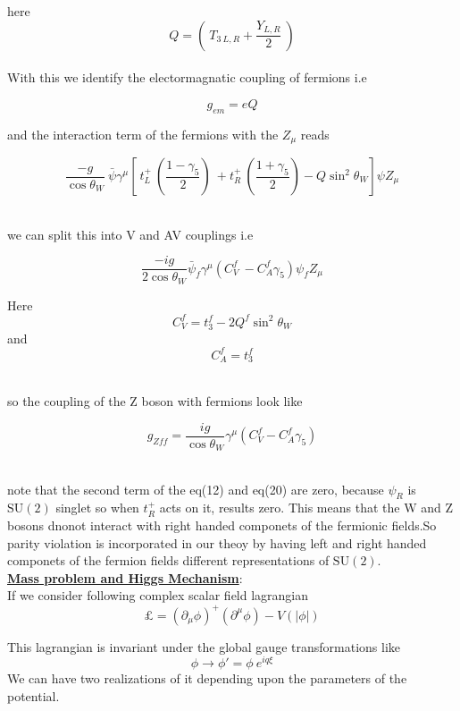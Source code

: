 \documentclass[12pt]{article}
\newcommand{\be}{\begin{equation}}
\newcommand{\ee}{\end{equation}}
\begin{document}
here 
\be Q=  \left (~T_{3\ L,R} +\frac{Y_{L,R}}{2}~\right) \ee \\

With this we identify the electormagnatic coupling of fermions i.e

$$g_{em}=eQ $$




and the interaction term of the fermions with the $Z_{\mu}$ reads

\be \frac{-g}{\cos{\theta_{W}}} ~ \bar{\psi} \gamma^{\mu}\left [ ~t_{L}^{+}~\left (\frac {1- \gamma_{5} } {2} \right) ~+  t_{R}^{+}~\left (\frac {1+ \gamma_{5} } {2}\right )-Q\sin^{2}{\theta_{W}} \right]\psi Z_{\mu} \ee \





we can split this into V and AV couplings i.e

\be \frac{-ig}{2\cos \theta_{W}} \bar \psi_{f} \gamma^{\mu} \left( C_{V}^{f}~-C_{A}^{f} \gamma_{5} \right ) \psi_{f} Z_{\mu}\ee

Here $$C_{V}^{f}=t_{3}^{f}-2  Q^{f}\sin^{2} \theta_{W}$$
and $$C_{A}^{f}=t_{3}^{f}$$ \

so the coupling of the Z boson with fermions look like

\be g_{Zff} =\frac{ig}{\cos \theta_{W} }\gamma^{\mu}\left(C_{V}^{f}-C_{A}^{f} \gamma_{5} \right )\ee \

note that the second term of the eq(12) and eq(20) are zero, because $\psi_{R}$ is 
$\mathrm{SU}(2)$ singlet so when $t_{R}^{+}$ acts on it, results zero. This means that the W and Z bosons dnonot interact with right handed componets of the fermionic fields.So parity violation is incorporated in our theoy by having left and right handed componets of the fermion fields different representations of $\mathrm{SU}(2)$.\\







\textbf{ \underline{Mass problem and Higgs Mechanism}}: \\
If we consider following complex scalar field lagrangian
\be \pounds =\left (\partial_{\mu} \phi\right)^{+} \left (\partial^{\mu}\phi\right)-V(|\phi|) \ee

This lagrangian is invariant under the global gauge transformations like
\be \phi \rightarrow \phi'= \phi~ e^{iq\xi} \ee
We can have two realizations of it depending upon the parameters of the potential. 
\end{document}
